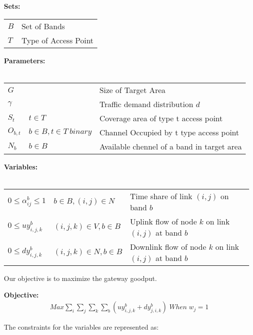 \noindent
{\bf Sets:}
\begin{tabular}{ll}
$B$ & Set of Bands \\
$T$ & Type of Access Point\\
\end{tabular}

\noindent
{\bf Parameters:}\\
\\
\begin{tabular}{llp{3.4cm}}
$G$ &  & Size of Target Area\\
$\gamma$ & & Traffic demand distribution $d$\\
$S_t$ & $t \in T$ & Coverage area of type t access point\\
$O_{b,t}$ & $b \in B, t \in T\ binary$ & Channel Occupied by t type access point\\
$N_b$ & $b \in B\ $ & Available chennel of a band in target area\\
\end{tabular}


\noindent
{\bf Variables:}\\
\\
\begin{tabular}{llp{3cm}}
$0\le \alpha_{ij}^b \le 1$  & $b\in B, (i,j) \in N$ & 
Time share of link $(i,j)$ on band $b$\\ 
$0\le uy_{i,j,k}^b$ & $(i,j,k) \in V, b \in B$ & 
Uplink flow of node $k$ on link $(i,j)$ at band $b$ \\ 
$0\le dy_{i,j,k}^b$ & $(i,j,k) \in N, b \in B$ & 
Downlink flow of node $k$ on link $(i,j)$ at band $b$ \\ 
\end{tabular}

Our objective is to maximize the gateway goodput.

\noindent
{\bf Objective:}
\begin{align}
& Max \sum_i\sum_j\sum_k\sum_b(uy_{i,j,k}^b+dy_{j,i,k}^b) \; When \; w_j=1
\end{align}

The constraints for the variables are represented as:  

